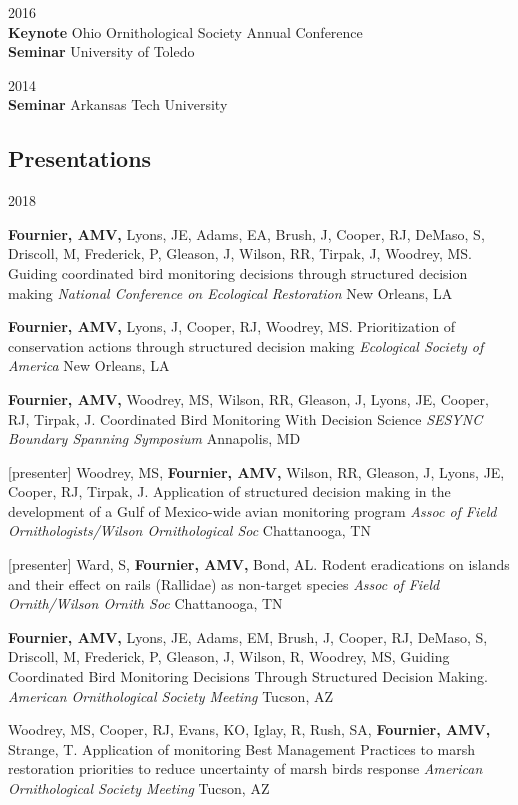\documentclass[]{article}
\begin{document}
2016\\
\textbf{Keynote} Ohio Ornithological Society Annual Conference\\
\textbf{Seminar} University of Toledo

2014\\
\textbf{Seminar} Arkansas Tech University

\subsection{Presentations}\label{presentations}

2018

\textbf{Fournier, AMV,} Lyons, JE, Adams, EA, Brush, J, Cooper, RJ,
DeMaso, S, Driscoll, M, Frederick, P, Gleason, J, Wilson, RR, Tirpak, J,
Woodrey, MS. Guiding coordinated bird monitoring decisions through
structured decision making \emph{National Conference on Ecological
Restoration} New Orleans, LA

\textbf{Fournier, AMV,} Lyons, J, Cooper, RJ, Woodrey, MS.
Prioritization of conservation actions through structured decision
making \emph{Ecological Society of America} New Orleans, LA

\textbf{Fournier, AMV,} Woodrey, MS, Wilson, RR, Gleason, J, Lyons, JE,
Cooper, RJ, Tirpak, J. Coordinated Bird Monitoring With Decision Science
\emph{SESYNC Boundary Spanning Symposium} Annapolis, MD

{[}presenter{]} Woodrey, MS, \textbf{Fournier, AMV,} Wilson, RR,
Gleason, J, Lyons, JE, Cooper, RJ, Tirpak, J. Application of structured
decision making in the development of a Gulf of Mexico-wide avian
monitoring program \emph{Assoc of Field Ornithologists/Wilson
Ornithological Soc } Chattanooga, TN

{[}presenter{]} Ward, S, \textbf{Fournier, AMV,} Bond, AL. Rodent
eradications on islands and their effect on rails (Rallidae) as
non-target species \emph{Assoc of Field Ornith/Wilson Ornith Soc}
Chattanooga, TN

\textbf{Fournier, AMV,} Lyons, JE, Adams, EM, Brush, J, Cooper, RJ,
DeMaso, S, Driscoll, M, Frederick, P, Gleason, J, Wilson, R, Woodrey,
MS, Guiding Coordinated Bird Monitoring Decisions Through Structured
Decision Making. \emph{American Ornithological Society Meeting} Tucson,
AZ

Woodrey, MS, Cooper, RJ, Evans, KO, Iglay, R, Rush, SA,
\textbf{Fournier, AMV,} Strange, T. Application of monitoring Best
Management Practices to marsh restoration priorities to reduce
uncertainty of marsh birds response \emph{American Ornithological
Society Meeting} Tucson, AZ
\end{document}
